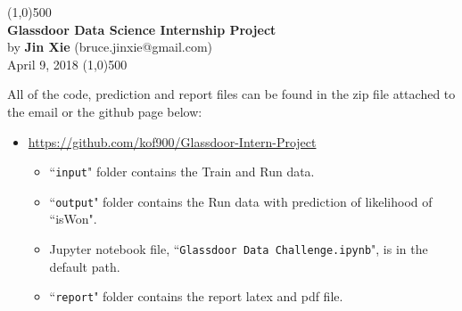 \documentclass[12pt]{report}
\begin{document}
\begin{center}
\line(1,0){500}\\
\Large{\textbf{Glassdoor Data Science Internship Project}}\\[2pt]
\large{by \textbf{Jin Xie} (bruce.jinxie@gmail.com)}\\[4pt]
\small{April 9, 2018}
\line(1,0){500}
\end{center}

\noindent All of the code, prediction and report files can be found in the zip file attached to the email or the github page below:
\begin{itemize}
	\item \url{https://github.com/kof900/Glassdoor-Intern-Project}
	\begin{itemize}
		\item ``\verb|input|" folder contains the Train and Run data.
		\item ``\verb|output|" folder contains the Run data with prediction of likelihood of ``isWon".
		\item Jupyter notebook file, ``\verb|Glassdoor Data Challenge.ipynb|", is in the default path.
		\item ``\verb|report|" folder contains the report latex and pdf file.
	\end{itemize}
\end{itemize}
\end{document}
